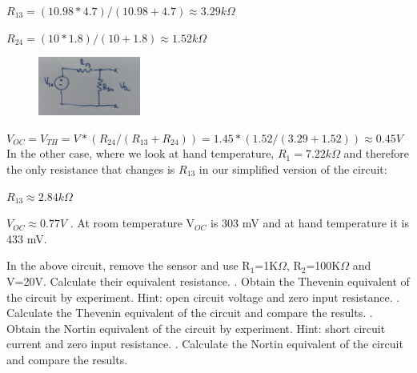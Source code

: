 {\begin{solution}
		$R_{13}=(10.98*4.7)/(10.98+4.7)\approx3.29k\Omega$
		
		$R_{24}=(10*1.8)/(10+1.8)\approx1.52k\Omega$
		
		\begin{figure}[h!]
			\centering
			\includegraphics[width=0.3\textwidth]{images/circuit214.jpg}
		\end{figure}
		
		$V_{OC}=V_{TH}=V*(R_{24}/(R_{13}+R_{24}))=1.45*(1.52/(3.29+1.52))\approx0.45V$
		\\
		In the other case, where we look at hand temperature, $R_{1}=7.22k\Omega$ and therefore the only resistance that changes is $R_{13}$ in our simplified version of the circuit:
		
		$R_{13}\approx2.84k\Omega$
		
		$V_{OC}\approx0.77V$
		. At room temperature V$_{OC}$ is 303 mV and at hand temperature it is 433 mV.
	\end{solution}
	\clearpage
	\begin{problem}
		In the above circuit, remove the sensor and use R\(_{1}\)=1K\(\Omega\), R\(_{2}\)=100K\(\Omega\) and V=20V. Calculate their equivalent resistance.
		. Obtain the Thevenin equivalent of the circuit by experiment. Hint: open circuit voltage and zero input resistance.
		. Calculate the Thevenin equivalent of the circuit and compare the results.
		. Obtain the Nortin equivalent of the circuit by experiment. Hint: short circuit current and zero input resistance.
		. Calculate the Nortin equivalent of the circuit and compare the results.
	\end{problem}
	
}
